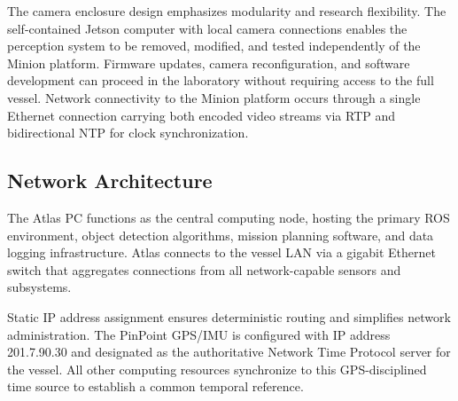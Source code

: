 The camera enclosure design emphasizes modularity and research flexibility. The self-contained Jetson computer with local camera connections enables the perception system to be removed, modified, and tested independently of the Minion platform. Firmware updates, camera reconfiguration, and software development can proceed in the laboratory without requiring access to the full vessel. Network connectivity to the Minion platform occurs through a single Ethernet connection carrying both encoded video streams via \ac{RTP} and bidirectional \ac{NTP} for clock synchronization.

\subsection{Network Architecture} \label{network_structure}


The Atlas PC functions as the central computing node, hosting the primary \ac{ROS} environment, object detection algorithms, mission planning software, and data logging infrastructure. Atlas connects to the vessel LAN via a gigabit Ethernet switch that aggregates connections from all network-capable sensors and subsystems.


Static IP address assignment ensures deterministic routing and simplifies network administration. The PinPoint \ac{GPS}/\ac{IMU} is configured with IP address 201.7.90.30 and designated as the authoritative Network Time Protocol server for the vessel. All other computing resources synchronize to this \ac{GPS}-disciplined time source to establish a common temporal reference.

